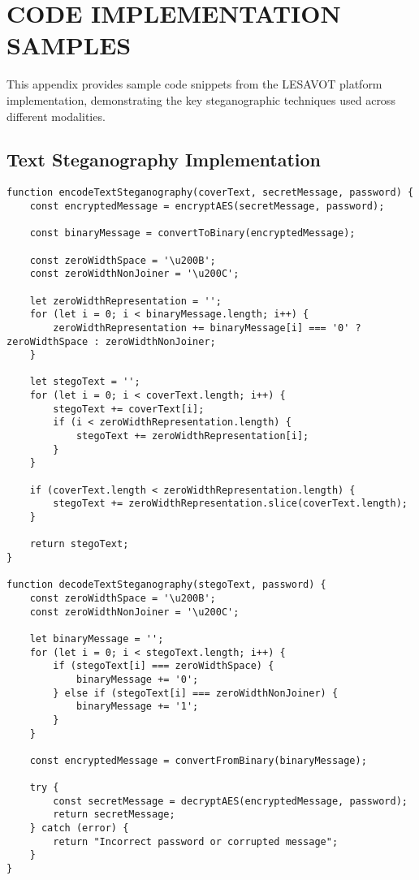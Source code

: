 \documentclass[12pt, a4paper, oneside]{book}
\begin{document}
\section*{CODE IMPLEMENTATION SAMPLES}

This appendix provides sample code snippets from the LESAVOT platform implementation, demonstrating the key steganographic techniques used across different modalities.

\subsection*{Text Steganography Implementation}

\begin{verbatim}
function encodeTextSteganography(coverText, secretMessage, password) {
    const encryptedMessage = encryptAES(secretMessage, password);

    const binaryMessage = convertToBinary(encryptedMessage);

    const zeroWidthSpace = '\u200B';
    const zeroWidthNonJoiner = '\u200C';

    let zeroWidthRepresentation = '';
    for (let i = 0; i < binaryMessage.length; i++) {
        zeroWidthRepresentation += binaryMessage[i] === '0' ? zeroWidthSpace : zeroWidthNonJoiner;
    }

    let stegoText = '';
    for (let i = 0; i < coverText.length; i++) {
        stegoText += coverText[i];
        if (i < zeroWidthRepresentation.length) {
            stegoText += zeroWidthRepresentation[i];
        }
    }

    if (coverText.length < zeroWidthRepresentation.length) {
        stegoText += zeroWidthRepresentation.slice(coverText.length);
    }

    return stegoText;
}

function decodeTextSteganography(stegoText, password) {
    const zeroWidthSpace = '\u200B';
    const zeroWidthNonJoiner = '\u200C';

    let binaryMessage = '';
    for (let i = 0; i < stegoText.length; i++) {
        if (stegoText[i] === zeroWidthSpace) {
            binaryMessage += '0';
        } else if (stegoText[i] === zeroWidthNonJoiner) {
            binaryMessage += '1';
        }
    }

    const encryptedMessage = convertFromBinary(binaryMessage);

    try {
        const secretMessage = decryptAES(encryptedMessage, password);
        return secretMessage;
    } catch (error) {
        return "Incorrect password or corrupted message";
    }
}
\end{verbatim}
\end{document}
